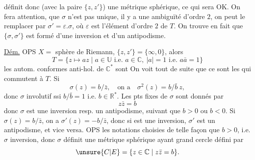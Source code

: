définit donc (avec la paire $\{z,z'\}$) une métrique sphérique, ce qui sera OK. On fera attention, que $\sigma$ n'est pas unique, il y a une ambiguïté d'ordre $2$, on peut le remplacer par $\sigma'=\varepsilon.\sigma$, où $\varepsilon$ est l'élément d'ordre $2$ de $T$. On trouve en fait que $\{\sigma,\sigma'\}$ est formé d'une inversion et d'un antipodisme.

\uline{Dém.} OPS $X=$ sphère de Riemann, $\{z,z'\}=\{\infty,0\}$, alors
\[
T=\{z\longmapsto az\mid a\in\mathbb U\text{ i.e. }a\in\mathbb C,\ |a|=1\text{ i.e. }a\bar a=1\}
\]
les  autom. conformes anti-hol. de $\mathbb C^*$ sont
On voit tout de suite que ce sont les \uline{} qui commutent à $T$.  Si
\[
\sigma(z)=b/\bar z,\quad\text{on a}\quad\sigma^2(z)=b/\bar b\ z,
\]
donc $\sigma$ involutif ssi $b/\bar b=1$ i.e. $b\in\mathbb R^*$. Les pts fixes de $\sigma$ sont donnés par
\[
z\bar z=b
\]
 donc $\sigma$ est une inversion resp. un antipodisme, suivant que  $b>0$ ou $b<0$. Si $\sigma(z)=b/\bar z$, on a $\sigma'(z)=-b/\bar z$,  donc si \inserted{$\sigma$} est une inversion, $\sigma'$ est un antipodisme, et vice versa. OPS les notations choisies de telle façon que $b>0$, i.e. $\sigma$ inversion, donc $\sigma$ définit une métrique sphérique ayant  grand cercle défini par
\[
\unsure{C|E}=\{z\in\mathbb C\mid z\bar z=b\}.
\]
